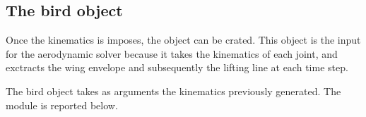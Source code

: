 \documentclass[letterpaper,10pt,english,openany,oneside]{sphinxmanual}
\begin{document}
\begin{quote}
\begin{sphinxVerbatim}[commandchars=\\\{\}]
 
       
           
           
          
              
          
              
\end{sphinxVerbatim}
\end{quote}


\subsection{The bird object}
\label{\detokenize{tutorial/bird_dynamics:the-bird-object}}
Once the kinematics is imposes, the object  can be crated. This object is the input for the aerodynamic solver because it takes the kinematics of each joint, and exctracts the wing envelope and subsequently the lifting line at each time step.

The bird object takes as arguments the kinematics previously generated. The module is reported below.
\end{document}
